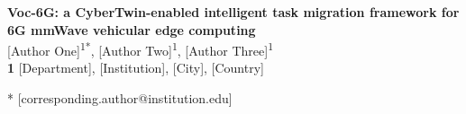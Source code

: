 \documentclass[10pt,letterpaper]{article}
\begin{document}
\vspace*{0.2in}

\begin{flushleft}
{\Large
\textbf{Voc-6G: a CyberTwin-enabled intelligent task migration framework for 6G mmWave vehicular edge computing} %
}
\newline
\\
[Author One]\textsuperscript{1*},
[Author Two]\textsuperscript{1},
[Author Three]\textsuperscript{1}
\\
\bigskip
\textbf{1} [Department], [Institution], [City], [Country]
\\
\bigskip


* [corresponding.author@institution.edu] %

\end{flushleft}


%
\end{document}
